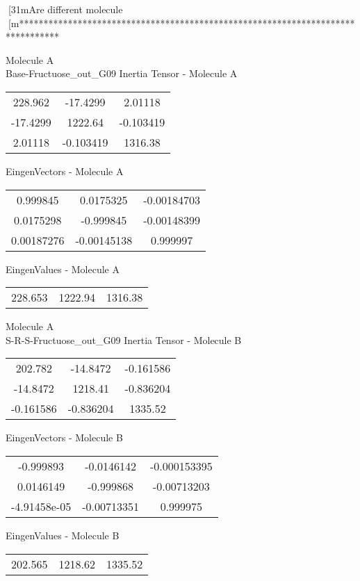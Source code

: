 [31mAre different molecule
[m********************************************************************************
\newpage
\begin{multicols}{2}
\begin{center}
Molecule A \\ 
Base-Fructuose_out_G09
Inertia Tensor - Molecule A \\
\vtab
\begin{tabular}{|c c c|}
228.962	 & 	-17.4299	 & 	2.01118	 \\
-17.4299	 & 	1222.64	 & 	-0.103419	 \\
2.01118	 & 	-0.103419	 & 	1316.38
\end{tabular}

\vtab
 EingenVectors - Molecule A     \\
\vtab
\begin{tabular}{|c c c|}
0.999845	 & 	0.0175325	 & 	-0.00184703	 \\
0.0175298	 & 	-0.999845	 & 	-0.00148399	 \\
0.00187276	 & 	-0.00145138	 & 	0.999997
\end{tabular}

\vtab
 EingenValues - Molecule A     \\
\vtab
\begin{tabular}{|c c c|}
228.653	 & 	1222.94	 & 	1316.38
\end{tabular}
\columnbreak
Molecule A \\ 
S-R-S-Fructuose_out_G09
Inertia Tensor - Molecule B \\
\vtab
\begin{tabular}{|c c c|}
202.782	 & 	-14.8472	 & 	-0.161586	 \\
-14.8472	 & 	1218.41	 & 	-0.836204	 \\
-0.161586	 & 	-0.836204	 & 	1335.52
\end{tabular}

\vtab
 EingenVectors - Molecule B     \\
\vtab
\begin{tabular}{|c c c|}
-0.999893	 & 	-0.0146142	 & 	-0.000153395	 \\
0.0146149	 & 	-0.999868	 & 	-0.00713203	 \\
-4.91458e-05	 & 	-0.00713351	 & 	0.999975
\end{tabular}

\vtab
 EingenValues - Molecule B     \\
\vtab
\begin{tabular}{|c c c|}
202.565	 & 	1218.62	 & 	1335.52
\end{tabular}
\end{center}
\end{multicols}
